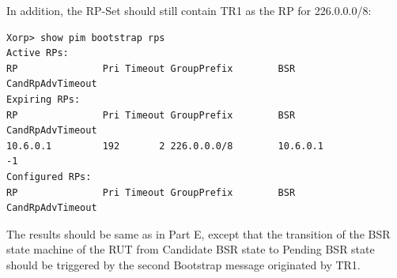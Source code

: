 \documentclass[11pt]{report}
\begin{document}
\begin{itemize}
  In addition, the RP-Set should still contain TR1 as the RP for 226.0.0.0/8:

\begin{verbatim}
Xorp> show pim bootstrap rps 
Active RPs:
RP               Pri Timeout GroupPrefix        BSR         CandRpAdvTimeout
Expiring RPs:
RP               Pri Timeout GroupPrefix        BSR         CandRpAdvTimeout
10.6.0.1         192       2 226.0.0.0/8        10.6.0.1                  -1
Configured RPs:
RP               Pri Timeout GroupPrefix        BSR         CandRpAdvTimeout
\end{verbatim}

\end{itemize}


The results should be same as in Part E, except that the transition
of the BSR state machine of the RUT from Candidate BSR state to
Pending BSR state should be triggered by the second Bootstrap message
originated by TR1.

\end{document}
